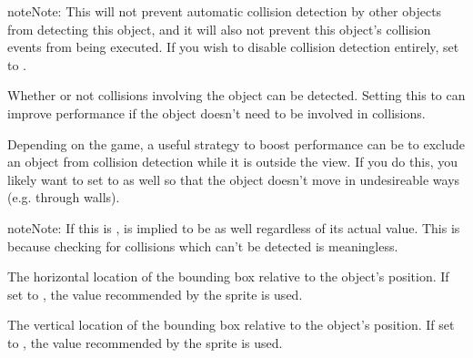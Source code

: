 \documentclass[letterpaper,10pt,english]{sphinxmanual}
\begin{document}
\begin{fulllineitems}
\begin{fulllineitems}
\begin{notice}{note}{Note:}
This will not prevent automatic collision detection by other
objects from detecting this object, and it will also not
prevent this object's collision events from being executed.
If you wish to disable collision detection entirely, set
{\hyperref[dsp:sge.dsp.Object.tangible]{\emph{}}} to .
\end{notice}

\end{fulllineitems}


\begin{fulllineitems}
\label{dsp:sge.dsp.Object.tangible}
Whether or not collisions involving the object can be detected.
Setting this to  can improve performance if the
object doesn't need to be involved in collisions.

Depending on the game, a useful strategy to boost performance can
be to exclude an object from collision detection while it is
outside the view.  If you do this, you likely want to set
{\hyperref[dsp:sge.dsp.Object.active]{\emph{}}} to  as well so that the object
doesn't move in undesireable ways (e.g. through walls).

\begin{notice}{note}{Note:}
If this is , {\hyperref[dsp:sge.dsp.Object.checks_collisions]{\emph{}}} is
implied to be  as well regardless of its actual
value.  This is because checking for collisions which can't be
detected is meaningless.
\end{notice}

\end{fulllineitems}


\begin{fulllineitems}
\label{dsp:sge.dsp.Object.bbox_x}
The horizontal location of the bounding box relative to the
object's position.  If set to , the value
recommended by the sprite is used.

\end{fulllineitems}


\begin{fulllineitems}
\label{dsp:sge.dsp.Object.bbox_y}
The vertical location of the bounding box relative to the
object's position.  If set to , the value
recommended by the sprite is used.


\end{fulllineitems}
\end{fulllineitems}
\end{document}
